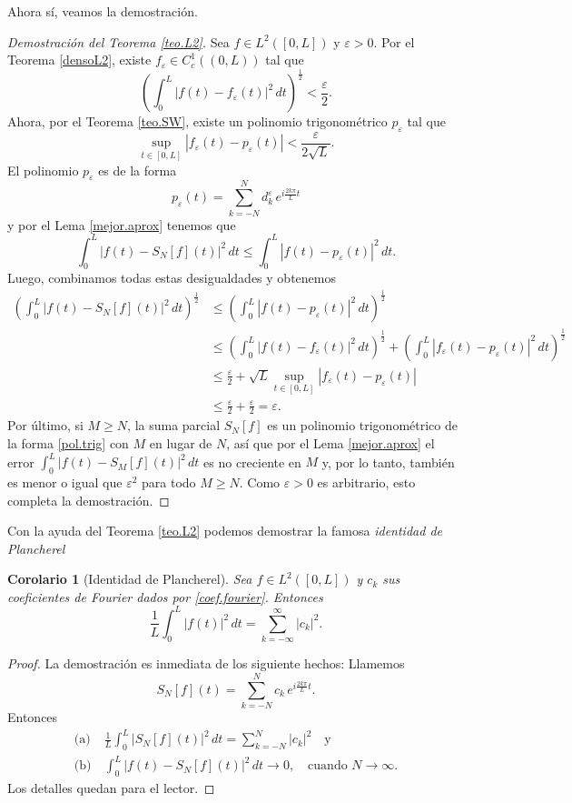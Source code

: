 \documentclass[12pt, a4paper]{amsbook}
\newcommand{\ve}{\varepsilon}
\newtheorem{cor}[teo]{Corolario}
\theoremstyle{remark}
\theoremstyle{definition}
\numberwithin{section}{chapter}
\numberwithin{subsection}{section}
\numberwithin{equation}{section}
\numberwithin{figure}{chapter}
\begin{document}
Ahora sí, veamos la demostración.
\begin{proof}[Demostración del Teorema \ref{teo.L2}]
Sea $f\in L^2([0,L])$ y $\ve>0$. Por el Teorema \ref{densoL2}, existe $f_\ve\in C^1_c((0,L))$ tal que 
$$
\left(\int_0^L |f(t)-f_\ve(t)|^2\, dt\right)^\frac12 < \frac{\ve}{2}.
$$
Ahora, por el Teorema \ref{teo.SW}, existe un polinomio trigonométrico $p_\ve$ tal que
$$
\sup_{t\in [0,L]} |f_\ve(t)-p_\ve(t)| < \frac{\ve}{2\sqrt{L}}.
$$
El polinomio $p_\ve$ es de la forma
$$
p_\ve(t) = \sum_{k=-N}^N d_k^\ve\, e^{i\frac{2k\pi}{L}t}
$$
y por el Lema \ref{mejor.aprox} tenemos que
$$
\int_0^L |f(t)-S_N[f](t)|^2\, dt \le \int_0^L |f(t) - p_\ve(t)|^2\, dt.
$$
Luego, combinamos todas estas desigualdades y obtenemos
\begin{align*}
\left(\int_0^L |f(t)-S_N[f](t)|^2\, dt\right)^\frac12 &\le \left(\int_0^L |f(t) - p_\ve(t)|^2\, dt\right)^\frac12\\
& \le \left(\int_0^L |f(t) - f_\ve(t)|^2\, dt\right)^\frac12 + \left(\int_0^L |f_\ve(t) - p_\ve(t)|^2\, dt\right)^\frac12\\
&\le \frac{\ve}{2} + \sqrt{L}  \sup_{t\in [0,L]} |f_\ve(t)-p_\ve(t)|\\
& \le \frac{\ve}{2} + \frac{\ve}{2} = \ve.
\end{align*}
Por último, si $M\ge N$, la suma parcial $S_N[f]$ es un polinomio trigonométrico de la forma \eqref{pol.trig} con $M$ en lugar de $N$, así que por el Lema \ref{mejor.aprox} el error $\int_0^L |f(t)-S_M[f](t)|^2\, dt$ es no creciente en $M$ y, por lo tanto, también es menor o igual que $\ve^2$ para todo $M\ge N$. Como $\ve>0$ es arbitrario, esto completa la demostración.
\end{proof}

Con la ayuda del Teorema \ref{teo.L2} podemos demostrar la famosa {\em identidad de Plancherel}
\begin{cor}[Identidad de Plancherel]\label{plancherel}
Sea $f\in L^2([0,L])$ y $c_k$ sus coeficientes de Fourier dados por \eqref{coef.fourier}. Entonces
$$
\frac{1}{L}\int_0^L |f(t)|^2\, dt = \sum_{k=-\infty}^\infty |c_k|^2.
$$
\end{cor}

\begin{proof}
La demostración es inmediata de los siguiente hechos: Llamemos
$$
S_N[f](t) = \sum_{k=-N}^N c_k\, e^{i \frac{2k\pi}{L}t}.
$$
Entonces
\begin{align*}
\text{(a)}\ &\frac{1}{L}\int_0^L |S_N[f](t)|^2\, dt = \sum_{k=-N}^N |c_k|^2 \quad \text{y}\\
\text{(b)}\ &\int_0^L |f(t) - S_N[f](t)|^2\, dt \to 0, \quad \text{cuando } N\to\infty.
\end{align*}
Los detalles quedan para el lector.
\end{proof}
\end{document}
